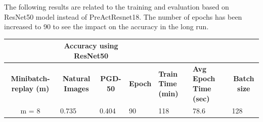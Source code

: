 \documentclass{article}
\begin{document}
The following results are related to the training and evaluation based on ResNet50 model instead of PreActResnet18. The number of epochs has been increased to 90 to see the impact on the accuracy in the long run. 




\begin{table}[hbt!]
\centering
\begin{tabular}{|c|c|l|l|l|l|l|}
\hline
\multicolumn{1}{|l|}{}        & \multicolumn{2}{c|}{\textbf{Accuracy using ResNet50}}                               & \multicolumn{3}{l|}{\textbf{}}                                                                                                            & \textbf{}                                \\ \hline
\textbf{Minibatch-replay (m)} & \textbf{Natural Images}                      & \multicolumn{1}{c|}{\textbf{PGD-50}} & \multicolumn{1}{c|}{\textbf{Epoch}} & \multicolumn{1}{p{1.5cm}|}{\textbf{Train Time (min)}} & \multicolumn{1}{p{1.5cm}|}{\textbf{Avg Epoch Time (sec)}} & \multicolumn{1}{c|}{\textbf{Batch size}} \\ \hline
m = 8       & \multicolumn{1}{l|}{0.735} & { 0.404}         & { 90}           & { 118}                     & { 78.6}                        & { 128}               \\ \hline
\end{tabular}
\end{table}

\newpage
\end{document}
